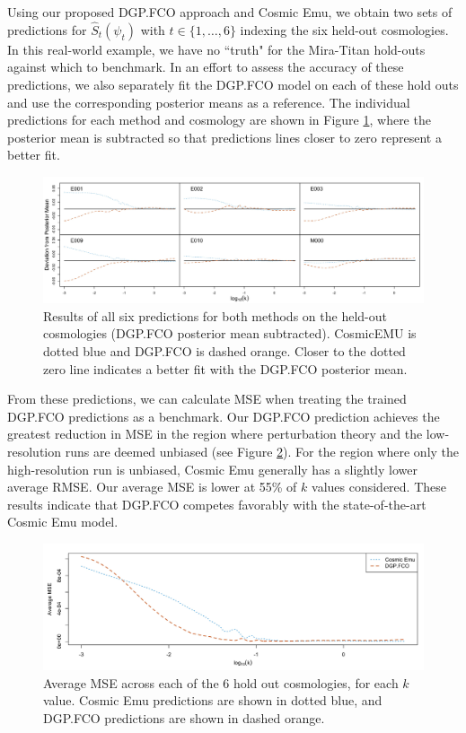 \documentclass[11pt]{article}
\begin{document}
Using our proposed DGP.FCO approach and Cosmic Emu, we obtain two sets of predictions for $\hat{S}_t(\psi_t)$ 
with $t\in\{1,\ldots,6\}$ indexing the six held-out cosmologies.  In this real-world example, we have
no ``truth" for the Mira-Titan hold-outs against which to benchmark. In an effort to assess the 
accuracy of these predictions, we also separately fit the DGP.FCO model on each of these hold outs
and use the corresponding posterior means as a reference. The individual predictions for each method and 
cosmology are shown in Figure \ref{fig:plot_pred_1to6}, where the posterior mean is subtracted so that
predictions lines closer to zero represent a better fit. 

\begin{figure}[!b]
    \centering
    \includegraphics[width=\textwidth]{pred_1to6.jpeg}
    \caption{Results of all six predictions for both methods on the held-out 
    cosmologies (DGP.FCO posterior mean subtracted). CosmicEMU is dotted blue and DGP.FCO is dashed orange.
    Closer to the dotted zero line indicates a better fit with the DGP.FCO posterior mean.}
    \label{fig:plot_pred_1to6}
\end{figure}

From these predictions, we can calculate MSE when treating the trained DGP.FCO predictions as a benchmark. 
Our DGP.FCO prediction achieves the greatest reduction in MSE in the region where perturbation theory
and the low-resolution runs are deemed unbiased (see Figure \ref{fig:mse_by_k}). For the region where only 
the high-resolution run is unbiased, Cosmic Emu generally has a slightly lower average RMSE. Our average MSE 
is lower at 55\% of $k$ values considered. These results indicate that DGP.FCO competes favorably with the 
state-of-the-art Cosmic Emu model.

\begin{figure}
    \centering
    \includegraphics[width=\textwidth]{mse_by_k.jpeg}
    \caption{Average MSE across each of the 6 hold out cosmologies, for each $k$ value. Cosmic Emu 
    predictions are shown in dotted blue, and DGP.FCO predictions are shown in dashed orange.}
    \label{fig:mse_by_k}
\end{figure}
\end{document}
